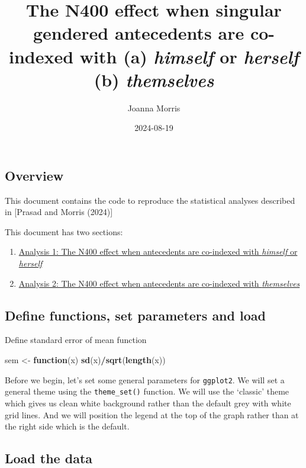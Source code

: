 \documentclass[
]{article}
\title{The N400 effect when singular gendered antecedents are co-indexed
with (a) \emph{himself} or \emph{herself} (b) \emph{themselves}}
\author{Joanna Morris}
\date{2024-08-19}
\newenvironment{Shaded}{\begin{snugshade}}{\end{snugshade}}
\newcommand{\ControlFlowTok}[1]{\textcolor[rgb]{0.13,0.29,0.53}{\textbf{#1}}}
\newcommand{\FunctionTok}[1]{\textcolor[rgb]{0.13,0.29,0.53}{\textbf{#1}}}
\newcommand{\NormalTok}[1]{#1}
\newcommand{\OtherTok}[1]{\textcolor[rgb]{0.56,0.35,0.01}{#1}}
\newcommand{\SpecialCharTok}[1]{\textcolor[rgb]{0.81,0.36,0.00}{\textbf{#1}}}
\providecommand{\tightlist}{%
  \setlength{\itemsep}{0pt}\setlength{\parskip}{0pt}}
\begin{document}
\maketitle

\subsection{Overview}\label{overview}

This document contains the code to reproduce the statistical analyses
described in {[}Prasad and Morris (2024){]}

This document has two sections:

\begin{enumerate}
\def\labelenumi{\arabic{enumi}.}
\setcounter{enumi}{1}
\tightlist
\item
  \hyperref[gender]{Analysis 1: The N400 effect when antecedents are
  co-indexed with \emph{himself} or \emph{herself}}
\item
  \hyperref[number]{Analysis 2: The N400 effect when antecedents are
  co-indexed with \emph{themselves}}
\end{enumerate}

\subsection{Define functions, set parameters and
load}\label{define-functions-set-parameters-and-load}

Define standard error of mean function

\begin{Shaded}
\begin{Highlighting}[]
\NormalTok{sem }\OtherTok{\textless{}{-}} \ControlFlowTok{function}\NormalTok{(x) }\FunctionTok{sd}\NormalTok{(x)}\SpecialCharTok{/}\FunctionTok{sqrt}\NormalTok{(}\FunctionTok{length}\NormalTok{(x))}
\end{Highlighting}
\end{Shaded}

Before we begin, let's set some general parameters for \texttt{ggplot2}.
We will set a general theme using the \texttt{theme\_set()} function. We
will use the `classic' theme which gives us clean white background
rather than the default grey with white grid lines. And we will position
the legend at the top of the graph rather than at the right side which
is the default.

\subsection{Load the data}\label{load-the-data}
\end{document}
